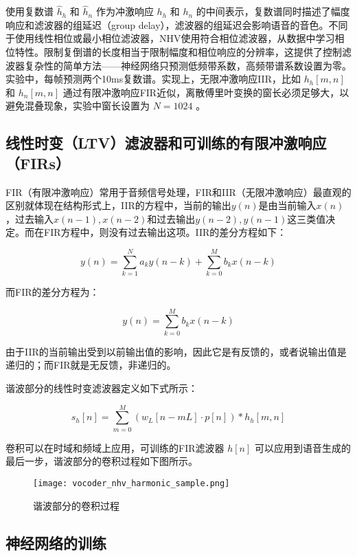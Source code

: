 \documentclass[cn,10pt,math=newtx,citestyle=gb7714-2015,bibstyle=gb7714-2015]{elegantbook}
\begin{document}
使用复数谱 $\hat{h}_h$ 和 $\hat{h}_n$ 作为冲激响应 $h_h$ 和 $h_n$ 的中间表示，复数谱同时描述了幅度响应和滤波器的组延迟（group delay），滤波器的组延迟会影响语音的音色。不同于使用线性相位或最小相位滤波器，NHV使用符合相位滤波器，从数据中学习相位特性。限制复倒谱的长度相当于限制幅度和相位响应的分辨率，这提供了控制滤波器复杂性的简单方法——神经网络只预测低频带系数，高频带谱系数设置为零。实验中，每帧预测两个10ms复数谱。实现上，无限冲激响应IIR，比如 $h_h[m,n]$ 和 $h_n[m,n]$ 通过有限冲激响应FIR近似，离散傅里叶变换的窗长必须足够大，以避免混叠现象，实验中窗长设置为 $N=1024$ 。

\subsection{线性时变（LTV）滤波器和可训练的有限冲激响应（FIRs）}

FIR（有限冲激响应）常用于音频信号处理，FIR和IIR（无限冲激响应）最直观的区别就体现在结构形式上，IIR的方程中，当前的输出$y(n)$是由当前输入$x(n)$，过去输入$x(n-1),x(n-2)$和过去输出$y(n-2),y(n-1)$这三类值决定。而在FIR方程中，则没有过去输出这项。IIR的差分方程如下：

\begin{equation}
  y(n)=\sum_{k=1}^N a_ky(n-k)+\sum_{k=0}^M b_kx(n-k)
\end{equation}

而FIR的差分方程为：

\begin{equation}
  y(n)=\sum_{k=0}^M b_k x(n-k)
\end{equation}

由于IIR的当前输出受到以前输出值的影响，因此它是有反馈的，或者说输出值是递归的；而FIR就是无反馈，非递归的。

谐波部分的线性时变滤波器定义如下式所示：

\begin{equation}
  s_h[n]=\sum_{m=0}^{M}(w_L[n-mL]\cdot p[n])*h_h[m,n]
\end{equation}

卷积可以在时域和频域上应用，可训练的FIR滤波器 $h[n]$ 可以应用到语音生成的最后一步，谐波部分的卷积过程如下图所示。

\begin{figure}[htbp]
  \centering
  \texttt{[image: vocoder\_nhv\_harmonic\_sample.png]}
  \caption{谐波部分的卷积过程 \label{fig:vocoder_nhv_harmonic_sample}}
\end{figure}

\subsection{神经网络的训练}
\end{document}
